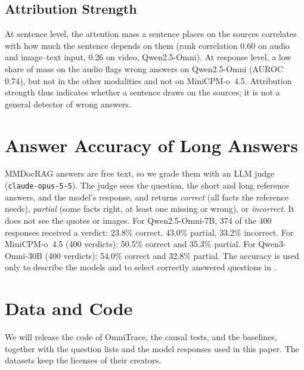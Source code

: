 \subsection{Attribution Strength}
\label{appendix:flagging}

At sentence level, the attention mass a sentence places on the sources correlates with how much the sentence depends on them (rank correlation 0.60 on audio and image--text input, 0.26 on video, Qwen2.5-Omni).
At response level, a low share of mass on the audio flags wrong answers on Qwen2.5-Omni (AUROC 0.74), but not in the other modalities and not on MiniCPM-o~4.5.
Attribution strength thus indicates whether a sentence draws on the sources; it is not a general detector of wrong answers.

\section{Answer Accuracy of Long Answers}
\label{appendix:judge}

MMDocRAG answers are free text, so we grade them with an LLM judge (\texttt{claude-opus-5-5}).
The judge sees the question, the short and long reference answers, and the model's response, and returns \emph{correct} (all facts the reference needs), \emph{partial} (some facts right, at least one missing or wrong), or \emph{incorrect}. It does not see the quotes or images.
For Qwen2.5-Omni-7B, 374 of the 400 responses received a verdict: 23.8\% correct, 43.0\% partial, 33.2\% incorrect.
For MiniCPM-o~4.5 (400 verdicts): 50.5\% correct and 35.3\% partial.
For Qwen3-Omni-30B (400 verdicts): 54.0\% correct and 32.8\% partial.
The accuracy is used only to describe the models and to select correctly answered questions in .

\section{Data and Code}
We will release the code of OmniTrace, the causal tests, and the baselines, together with the question lists and the model responses used in this paper. The datasets keep the licenses of their creators.
